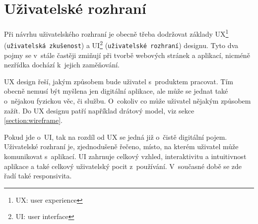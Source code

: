 \section{Uživatelské rozhraní}
Při návrhu uživatelského rozhraní je obecně třeba dodržovat základy UX\footnote{UX: user experience} (\texttt{uživatelská zkušenost}) a UI\footnote{UI: user interface} (\texttt{uživatelské rozhraní}) designu. Tyto dva pojmy se v~stále častěji zmiňují při tvorbě webových stránek a aplikací, nicméně nezřídka dochází k~jejich zaměňování. 
\par UX design řeší, jakým způsobem bude uživatel s~produktem pracovat. Tím obecně nemusí být myšlena jen digitální aplikace, ale může se jednat také o~nějakou fyzickou věc, či službu. O~cokoliv co může uživatel nějakým způsobem zažít. Do UX designu patří například drátový model, viz sekce \ref{section:wireframe}.
\par Pokud jde o~UI, tak na rozdíl od UX se jedná již o~čistě digitální pojem. Uživatelské rozhraní je, zjednodušeně řečeno, místo, na kterém uživatel může komunikovat s~aplikací. UI zahrnuje celkový vzhled, interaktivitu a intuitivnost aplikace a také celkový uživatelský pocit z~používání. V~současné době se zde řadí také responsivita.

